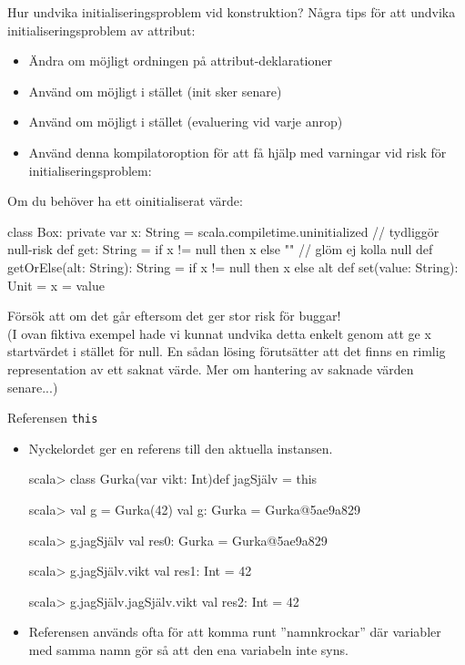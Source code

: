 \begin{Slide}{Hur undvika initialiseringsproblem vid konstruktion?}
\SlideFontSmall
Några tips för att undvika initialiseringsproblem av attribut:
\begin{itemize}
  \item Ändra om möjligt ordningen på attribut-deklarationer
  \item Använd om möjligt i stället  (init sker senare)
  \item Använd om möjligt i stället  (evaluering vid varje anrop)
  \item Använd denna kompilatoroption för att få hjälp med varningar vid risk för initialiseringsproblem: 
\end{itemize}
\pause
Om du  behöver ha ett oinitialiserat värde:
\begin{Code}
class Box:
  private var x: String = scala.compiletime.uninitialized // tydliggör null-risk
  def get: String = if x != null then x else ""           // glöm ej kolla null
  def getOrElse(alt: String): String = if x != null then x else alt  
  def set(value: String): Unit = x = value
\end{Code}
Försök att   om det går eftersom det ger stor risk för buggar!\\
{\SlideFontTiny (I ovan fiktiva exempel hade vi kunnat undvika detta enkelt genom att ge x startvärdet  i stället för null. En sådan lösing förutsätter att det finns en rimlig representation av ett saknat värde. Mer om hantering av saknade värden senare...)}

\end{Slide}

\begin{Slide}{Referensen \texttt{this}}\SlideFontSmall
\begin{itemize}
\item Nyckelordet  ger en referens till den aktuella instansen.
\begin{REPLnonum}
scala> class Gurka(var vikt: Int){def jagSjälv = this}

scala> val g = Gurka(42)
val g: Gurka = Gurka@5ae9a829

scala> g.jagSjälv
val res0: Gurka = Gurka@5ae9a829

scala> g.jagSjälv.vikt
val res1: Int = 42

scala> g.jagSjälv.jagSjälv.vikt
val res2: Int = 42
\end{REPLnonum}
\item Referensen  används ofta för att komma runt ''namnkrockar'' där variabler med samma namn gör så att den ena variabeln inte syns.
\end{itemize}
\end{Slide}



